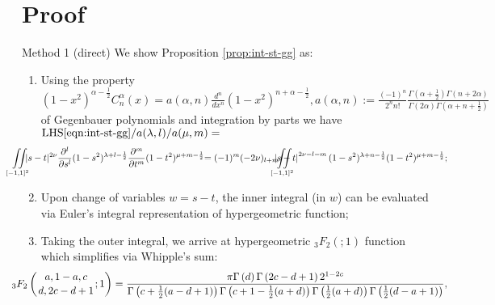\documentclass[pdf,notes]{beamer}
\begin{document}
\section{Proof}
\begin{frame}{Method 1 (direct)}
	\scriptsize
	We show Proposition \ref{prop:int-st-gg} as:
	\begin{enumerate}
		\item Using the property $
				(1-x^2)^{\alpha-\frac{1}{2}}C_n^\alpha(x)=a(\alpha,n)
				\frac{d^n}{dx^n} (1-x^2)^{n+\alpha-\frac{1}{2}}, a(\alpha,n):=\frac{(-1)^n}{2^nn!}\frac{\Gamma\left( \alpha+\frac{1}{2} \right)\Gamma\left( n+2\alpha \right)}{\Gamma(2\alpha)\Gamma\left(\alpha+n+\frac{1}{2}  \right)}$
				of Gegenbauer polynomials and integration by parts we have ${\mbox{LHS}\eqref{eqn:int-st-gg}}/{a(\lambda,l)/a(\mu,m)}=$\begin{equation*}
					\kern-1.2cm
					\iint\displaylimits_{[-1,1]^2}
					\kern-0.2cm| s - t |^{2 \nu} \frac{\partial^l}{\partial s^l}(1-s^2)^{\lambda+l-\frac{1}{2}}\frac{\partial^m}{\partial t^m}(1-t^2)^{\mu+m-\frac{1}{2}}
					\kern-0.1cm=(-1)^m(-2\nu)_{l+m}\kern-0.2cm\iint\displaylimits_{[-1,1]^2}\kern-0.8cm\myabs{s-t}^{2\nu-l-m}(1-s^2)^{\lambda+n-\frac{1}{2}}(1-t^2)^{\mu+m-\frac{1}{2}};
				\end{equation*}
		\item Upon change of variables $w=s-t$, the inner integral (in $w$) can be evaluated via Euler's integral representation of hypergeometric function;
	\item Taking the outer integral, we arrive at hypergeometric $_3F_2(;1)$ function which simplifies via Whipple's sum:\begin{equation*}
		\kern-1cm{}_{3}F_{2}\left({a,1-a,c\atop d,2c-d+1};1\right)=\frac{\pi\Gamma\left(d%
				\right)\Gamma\left(2c-d+1\right)2^{1-2c}}{\Gamma\left(c+\frac{1}{2}(a-d+1)%
				\right)\Gamma\left(c+1-\frac{1}{2}(a+d)\right)\Gamma\left(\frac{1}{2}(a+d)%
			\right)\Gamma\left(\frac{1}{2}(d-a+1)\right)},
		\end{equation*}
	\end{enumerate}
\end{frame}
\end{document}
